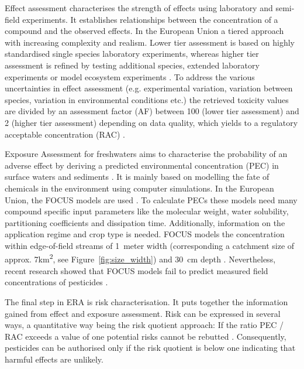 Effect assessment characterises the strength of effects using laboratory and semi-field experiments.
It establishes relationships between the concentration of a compound and the observed effects.
In the European Union a tiered approach with increasing complexity and realism.
Lower tier assessment is based on highly standardised single species laboratory experiments, whereas higher tier assessment is refined by testing additional species, extended laboratory experiments or model ecosystem experiments \citep{brock_aquatic_2006}. 
To address the various uncertainties in effect assessment (e.g. experimental variation, variation between species, variation in environmental conditions etc.) the retrieved toxicity values are divided by an assessment factor (AF) between 100 (lower tier assessment) and 2 (higher tier assessment) depending on data quality, which yields to a regulatory acceptable concentration (RAC) \citep{efsa_guidance_2013, brock_aquatic_2006}. 

Exposure Assessment for freshwaters aims to characterise the probability of an adverse effect by deriving a predicted environmental concentration (PEC) in surface waters and sediments \citep{newman_fundamentals_2015}. 
It is mainly based on modelling the fate of chemicals in the environment using computer simulations. 
In the European Union, the FOCUS models are used \citep{focus_focus_2001, efsa_guidance_2013}.
To calculate PECs these models need many compound specific input parameters like the molecular weight, water solubility, partitioning coefficients and dissipation time. 
Additionally, information on the application regime and crop type is needed. 
FOCUS models the concentration within edge-of-field streams of 1~meter width (corresponding a catchment size of approx. 7km\textsuperscript{2}, see Figure~\ref{fig:size_width}) and 30~cm depth \citep{erlacher_regulation_2011}. 
Nevertheless, recent research showed that FOCUS models fail to predict measured field concentrations of pesticides \citep{knabel_regulatory_2012, knabel_fungicide_2014}. 

The final step in ERA is risk characterisation.
It puts together the information gained from effect and exposure assessment. 
Risk can be expressed in several ways, a quantitative way being the risk quotient approach: If the ratio PEC / RAC exceeds a value of one potential risks cannot be rebutted \citep{efsa_guidance_2013, suter_ecological_2007,  solomon_probabilistic_2000}. 
Consequently, pesticides can be authorised only if the risk quotient is below one indicating that harmful effects are unlikely.



